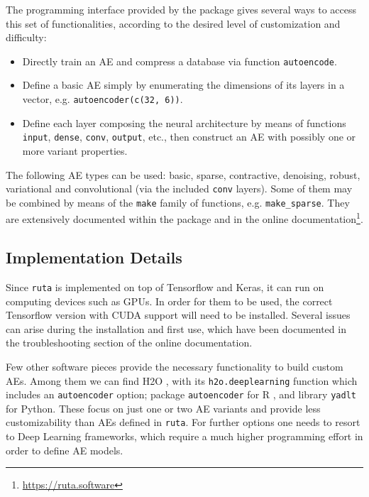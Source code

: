 The programming interface provided by the package gives several ways to access this set of functionalities, according to the desired level of customization and difficulty:

\begin{itemize}
\item Directly train an AE and compress a database via function \texttt{autoencode}.
\item Define a basic AE simply by enumerating the dimensions of its layers in a vector, e.g. \texttt{autoencoder(c(32, 6))}.
  \item Define each layer composing the neural architecture by means of functions \texttt{input}, \texttt{dense}, {\texttt{conv},} \texttt{output}, etc., then construct an AE with possibly one or more variant properties.
\end{itemize}

The following AE types can be used: basic, sparse, contractive, denoising, robust, variational {and convolutional (via the included \texttt{conv} layers)}. Some of them may be combined by means of the \texttt{make} family of functions, e.g. \texttt{make\_sparse}. They are extensively documented within the package and in the online documentation\footnote{\url{https://ruta.software}}.


\subsection{Implementation Details}
\label{p2sec.implementation}

Since \texttt{ruta} is implemented on top of Tensorflow and Keras, it can run on computing devices such as GPUs. In order for them to be used, the correct Tensorflow version with CUDA support will need to be installed. Several issues can arise during the installation and first use, which have been documented in the troubleshooting section of the online documentation.

Few other software pieces provide the necessary functionality to build custom AEs. Among them we can find H2O , with its \texttt{h2o.deeplearning} function which includes an \texttt{autoencoder} option; package \texttt{autoencoder} for R , and library \texttt{yadlt} for Python. These focus on just one or two AE variants and provide less customizability than AEs defined in \texttt{ruta}. For further options one needs to resort to Deep Learning frameworks, which require a much higher programming effort in order to define AE models.

